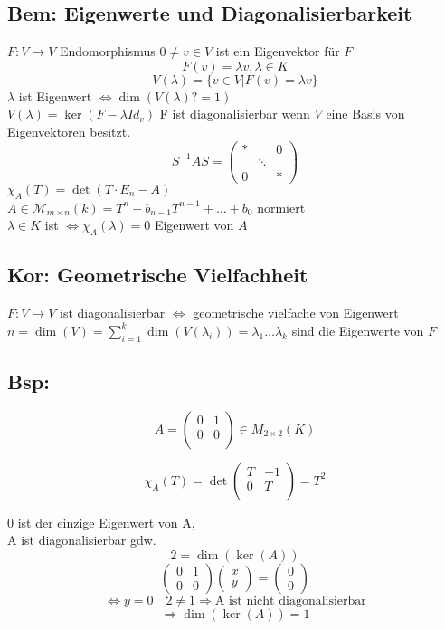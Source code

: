 \documentclass[titlepage,12pt,a4paper,ngerman]{report}
\newcommand{\tx}[1]{\textrm{#1}}
\begin{document}
\subsection{Bem: Eigenwerte und Diagonalisierbarkeit} $F: V \rightarrow V$ Endomorphismus $0 \neq v \in V$ ist ein Eigenvektor für $F$ 
$$F(v) = \lambda v , \lambda \in K$$
$$V(\lambda)=\{v \in V | F(v) = \lambda v \}$$ 
$\lambda$ ist Eigenwert $\Leftrightarrow \dim(V(\lambda)?=1)$\\
$V(\lambda) = \ker(F - \lambda Id_v)$ F ist diagonalisierbar wenn $V$ eine Basis von Eigenvektoren besitzt.\\
$$S^{-1}AS =\begin{pmatrix}
* & & 0 \\
& \ddots & \\
0 & & *
\end{pmatrix}$$
$\chi_A(T) =\det(T \cdot E_n - A)$\\
$A \in \mathcal{M}_{m \times n}(k) = T^n + b_{n-1} T^{n-1} + \dots + b_0$ normiert\\
$\lambda \in K$ ist $\Leftrightarrow \chi_A (\lambda) = 0$ Eigenwert von $A$\\
\subsection{Kor: Geometrische Vielfachheit}
$F: V \rightarrow V$ ist diagonalisierbar $\Leftrightarrow$ geometrische vielfache von Eigenwert $n = \dim(V) = \sum_{i = 1}^k \dim(V(\lambda_i)) = \lambda_1 \dots \lambda_k$ sind die Eigenwerte von $F$\\

\subsection{Bsp:}
$$A= \begin{pmatrix}
0  & 1 \\
0  & 0 \\
\end{pmatrix} 
\in M_{2\times 2} (K) $$

$$\chi_A(T) = \det \begin{pmatrix}
T & -1 \\
0 & T \\
\end{pmatrix}
= T^2$$

0 ist der einzige Eigenwert von A,\\
A ist diagonalisierbar gdw. \\
$$ 2 = \dim ( \ker (A) )$$
$$\begin{pmatrix}
0 & 1\\
0 & 0
\end{pmatrix} \begin{pmatrix}
x\\y
\end{pmatrix} = \begin{pmatrix}
0\\0
\end{pmatrix}$$
$$\Leftrightarrow y = 0 \quad 2 \neq 1 \Rightarrow \tx{A ist nicht diagonalisierbar}$$
$$\Rightarrow \dim(\ker(A)) = 1 $$
\end{document}

